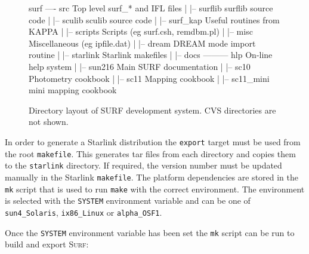 \documentclass[twoside,11pt,nolof]{starlink}
\providecommand{\scusoft}          {\textsc{Surf}}
\begin{document}
\begin{figure}
\begin{center}
\begin{terminalv}
surf ---- src                          Top level surf_* and IFL files
      |
      |-- surflib                      surflib source code
      |
      |-- sculib                       sculib source code
      |
      |-- surf_kap                     Useful routines from KAPPA
      |
      |-- scripts                      Scripts (eg surf.csh, remdbm.pl)
      |
      |-- misc                         Miscellaneous (eg ipfile.dat)
      |
      |-- dream                        DREAM mode import routine
      |
      |-- starlink                     Starlink makefiles
      |
      |-- docs --------- hlp           On-line help system
                     |
                     |-- sun216        Main SURF documentation
                     |
                     |-- sc10          Photometry cookbook
                     |
                     |-- sc11          Mapping cookbook
                     |
                     |-- sc11_mini     mini mapping cookbook
\end{terminalv}
\end{center}
\caption{Directory layout of SURF development system. CVS directories are not
shown.}
\label{surf:devel}
\end{figure}

In order to generate a Starlink distribution the \texttt{export} target must
be used from the root \texttt{makefile}. This generates tar files from each
directory and copies them to the \texttt{starlink} directory.  If required, the
version number must be updated manually in the Starlink \texttt{makefile}.
The platform dependencies are stored in the \texttt{mk} script that is used
to run \texttt{make} with the correct environment. The environment is selected
with the \texttt{SYSTEM} environment variable and can be one of
\texttt{sun4\_Solaris}, \texttt{ix86\_Linux} or \texttt{alpha\_OSF1}.

Once the \texttt{SYSTEM} environment variable has been set the \texttt{mk}
script can be run to build and export \scusoft:
\end{document}
